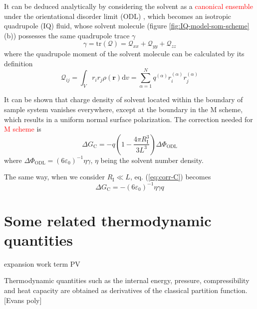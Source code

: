 It can be deduced analytically by considering the solvent as a \textcolor{red}{canonical
ensemble} under the orientational disorder limit (ODL) \citep{Kastenholz_2006_I},
which becomes an isotropic quadrupole (IQ) fluid, whose solvent molecule
(figure \ref{fig:IQ-model-som-scheme} (b)) possesses the same quadrupole
trace $\gamma$ 
\begin{equation}
\gamma=\mathrm{tr}(\mathbf{\mathcal{Q}})=\mathcal{Q}_{xx}+\mathcal{Q}_{yy}+\mathcal{Q}_{zz}
\end{equation}
where the quadrupole moment of the solvent molecule can be calculated
by its definition \citep{Multipole}
\begin{equation}
\mathcal{Q}_{ij}=\int_{V}r_{i}r_{j}\rho(\mathbf{r})\mathrm{d}v=\sum_{\alpha=1}^{N}q^{(\alpha)}r_{i}^{(\alpha)}r_{j}^{(\alpha)}
\end{equation}


It can be shown that charge density of solvent located within the
boundary of sample system vanishes everywhere, except at the boundary
in the M scheme, which results in a uniform normal surface polarization.
The correction needed for\textcolor{red}{{} M scheme }is
\begin{equation}
\Delta G_{\mathrm{C}}=-q\left(1-\frac{4\pi R_{\mathrm{I}}^{3}}{3L^{3}}\right)\Delta\Phi_{\mathrm{ODL}}\label{eq:corr-C}
\end{equation}
where $\Delta\Phi_{\mathrm{ODL}}=\left(6\varepsilon_{0}\right)^{-1}\eta\gamma$,
$\eta$ being the solvent number density.

The same way, when we consider $R_{\mathrm{I}}\ll L$, eq. (\ref{eq:corr-C})
becomes
\begin{equation}
\Delta G_{\mathrm{C}}=-\left(6\varepsilon_{0}\right)^{-1}\eta\gamma q
\end{equation}



\section{Some related thermodynamic quantities}

\textquotedbl{}expansion work\textquotedbl{} term PV

Thermodynamic quantities such as the internal energy, pressure, compressibility
and heat capacity are obtained as derivatives of the classical partition
function. {[}Evans poly{]}

